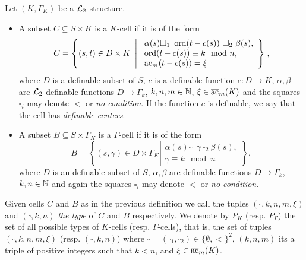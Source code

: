 \begin{defn}[Cells]\label{def:cell} Let $(K,\Gamma_K)$ be a ${\mathcal L}_2$-structure.  
\begin{itemize}[leftmargin=*]
\item A subset $C\subseteq S\times K$ is a $K$-cell if it is of the form 
\[C = \left\{(s,t) \in D\times K \ \left| \ \begin{array}{l} \alpha(s) \square_1 \ \operatorname{ord}(t-c(s)) \ \square_2 \ \beta(s),\\ \operatorname{ord}(t-c(s)) \equiv k\mod n,\\ {\overline{\rm ac}}_{m}(t-c(s)) = \xi \end{array} \right\}\right.,\]
where $D$ is a definable subset of $S$, $c$ is a definable function $c:D\to K$, $\alpha, \beta$ are $\mathcal{L}_2$-definable functions $D\to\Gamma_k$, $k, n, m \in {\mathbb N}$, $\xi \in {\overline{\rm ac}}_{m}(K)$ and the squares $\square_i$ may denote $<$ or \emph{no condition}. If the function $c$ is definable, we say that the cell has \emph{definable centers}.  
\item A subset $B\subseteq S\times \Gamma_K$ is a $\Gamma$-cell if it is of the form
\[B= \left\{(s,\gamma)\in D\times \Gamma_K \left|\begin{array}{l} \alpha(s) \square_1 \ \gamma \ \square_2 \ \beta(s), \\
\gamma \equiv k\mod n \end{array}\right\}\right.,\]
where $D$ is an definable subset of $S$, $\alpha, \beta$ are definable functions $D\to\Gamma_k$, $k, n\in {\mathbb N}$ and again the squares $\square_i$ may denote $<$ or \emph{no condition}.  
\end{itemize}
\end{defn}

Given cells $C$ and $B$ as in the previous definition we call the tuples $(\square,k,n,m,\xi)$ and $(\square,k,n)$ \emph{the type} of $C$ and $B$ respectively. We denote by $P_K$ (resp. $P_\Gamma$) the set of all possible types of $K$-cells (resp. $\Gamma$-cells), that is, the set of tuples $(\square,k,n,m,\xi)$  (resp. $(\square,k,n)$) where $\square = (\square_1, \square_2) \in \{\emptyset, <\}^{2}$, $(k,n,m)$ its a triple of positive integers such that $k<n$, and $\xi\in {\overline{\rm ac}}_{m}(K)$. 


